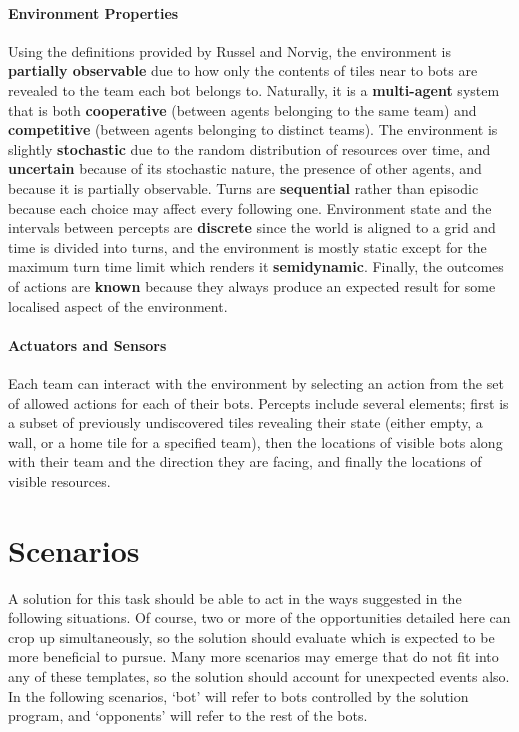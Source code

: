 \documentclass[a4paper,10pt]{article}
\begin{document}
\paragraph{Environment Properties}
Using the definitions provided by Russel and Norvig\cite{norvig10}, the environment is \textbf{partially observable} due to how only the contents of tiles near to bots are revealed to the team each bot belongs to. Naturally, it is a \textbf{multi-agent} system that is both \textbf{cooperative} (between agents belonging to the same team) and \textbf{competitive} (between agents belonging to distinct teams). The environment is slightly \textbf{stochastic} due to the random distribution of resources over time, and \textbf{uncertain} because of its stochastic nature, the presence of other agents, and because it is partially observable. Turns are \textbf{sequential} rather than episodic because each choice may affect every following one. Environment state and the intervals between percepts are \textbf{discrete} since the world is aligned to a grid and time is divided into turns, and the environment is mostly static except for the maximum turn time limit which renders it \textbf{semidynamic}. Finally, the outcomes of actions are \textbf{known} because they always produce an expected result for some localised aspect of the environment.

\paragraph{Actuators and Sensors}
Each team can interact with the environment by selecting an action from the set of allowed actions for each of their bots. Percepts include several elements; first is a subset of previously undiscovered tiles revealing their state (either empty, a wall, or a home tile for a specified team), then the locations of visible bots along with their team and the direction they are facing, and finally the locations of visible resources.

\section{Scenarios}
A solution for this task should be able to act in the ways suggested in the following situations. Of course, two or more of the opportunities detailed here can crop up simultaneously, so the solution should evaluate which is expected to be more beneficial to pursue. Many more scenarios may emerge that do not fit into any of these templates, so the solution should account for unexpected events also. In the following scenarios, `bot' will refer to bots controlled by the solution program, and `opponents' will refer to the rest of the bots.
\end{document}
